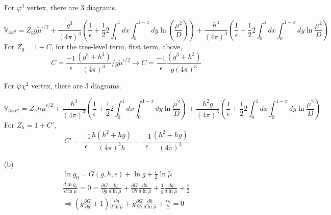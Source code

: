\documentclass[twoside]{amsart}
\begin{document}
\begin{itemize}
For $\varphi^3$ vertex, there are 3 diagrams.  

\[
\mathbb{V}_{3\varphi^3}  = Z_g g \widetilde{\mu}^{\epsilon/2} + \frac{ g^3}{(4\pi)^3} \left( \frac{1}{ \epsilon } + \frac{1}{2} 2 \int_0^1 dx \int_0^{1-x} dy \ln{ \left( \frac{ \mu^2}{ D} \right) } \right) + \frac{h^3}{ (4\pi)^3} \left( \frac{1}{ \epsilon } + \frac{1}{2} 2 \int_0^1 dx \int_0^{1-x} dy \ln{ \frac{\mu^2}{ D} } \right) 
\]
For $Z_g = 1 + C$, for the tree-level term, first term, above,
\[
C = \frac{-1}{ \epsilon} \frac{ (g^3 + h^3) }{ (4\pi)^3} / g\widetilde{\mu}^{\epsilon/2} \to \boxed{ C = \frac{-1}{\epsilon} \frac{ (g^3 + h^3) }{ g(4\pi)^3 } }
\]  

For $\varphi \chi^2$ vertex, there are 3 diagrams.  

\[
\mathbb{V}_{3\varphi \chi^2} = Z_h h \widetilde{\mu}^{\epsilon/2} + \frac{ h^3}{ (4\pi)^3} \left( \frac{1}{ \epsilon} + \frac{1}{2} 2 \int_0^1 dx \int_0^{1-x} dy \ln{ \frac{ \mu^2}{ D} } \right) + \frac{h^2 g}{ (4\pi)^3} \left( \frac{1}{ \epsilon} + \frac{1}{2} 2 \int_0^1 dx \int_0^{1-x} dy \ln{ \frac{\mu^2 }{ D} } \right)
\]
For $Z_h = 1 + C'$,
\[
C' = \frac{-1}{\epsilon}\frac{ h (h^2 + hg) }{ (4\pi)^3 h} = \boxed{ \frac{-1}{\epsilon} \frac{ (h^2 + hg) }{ (4\pi)^3} }
\]
\item[(b)] \[
\begin{gathered}
  \ln{ g_0 } = G(g,h,\epsilon) + \ln{g} + \frac{\epsilon}{2} \ln{\widetilde{\mu}} \\ 
  \frac{ d\ln{ g_0}}{ d\ln{ \mu}} = 0 = \frac{ \partial G}{ \partial g} \frac{dg}{ d\ln{\mu} } + \frac{ \partial G}{ \partial h} \frac{dh}{ d\ln{ \mu }} + \frac{1}{g} \frac{ dg}{ d\ln{ \mu}} + \frac{\epsilon}{2} \\ 
  \Longrightarrow \left( g \frac{ \partial G}{ \partial g} + 1 \right) \frac{dg}{ d\ln{ \mu}} + g \frac{\partial G}{ \partial h } \frac{ dh}{ d\ln{ \mu}} + \frac{ \epsilon g}{ 2}  =0 
\end{gathered}
\]


\end{itemize}
\end{document}
